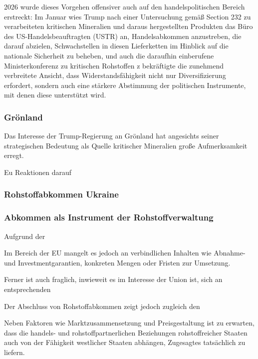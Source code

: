 \documentclass[12pt,a4paper,oneside]{book} %
\begin{document}
{2026 wurde dieses Vorgehen offensiver auch auf den handelspolitischen Bereich erstreckt:  Im Januar wies Trump nach einer Untersuchung gemäß Section 232 zu verarbeiteten kritischen Mineralien und daraus hergestellten Produkten das Büro des US-Handelsbeauftragten (USTR) an, Handelsabkommen anzustreben, die darauf abzielen, Schwachstellen in diesen Lieferketten im Hinblick auf die nationale Sicherheit zu beheben, und auch die daraufhin einberufene Ministerkonferenz zu kritischen Rohstoffen z bekräftigte die zunehmend verbreitete Ansicht, dass Widerstandsfähigkeit nicht nur Diversifizierung erfordert, sondern auch eine stärkere Abstimmung der politischen Instrumente, mit denen diese unterstützt wird.\autocite{EY, Trade policy and the 2026 redesign of critical mineral supply chains}

\subsubsection{Grönland}

Das Interesse der Trump-Regierung an Grönland hat angesichts seiner strategischen Bedeutung als Quelle kritischer Mineralien große Aufmerksamkeit erregt.

Eu Reaktionen darauf

\subsubsection{Rohstoffabkommen Ukraine}


\subsubsection{Abkommen als Instrument der Rohstoffverwaltung}


Aufgrund der 

Im Bereich der EU mangelt es jedoch an verbindlichen Inhalten wie Abnahme- und Investmentgarantien, konkreten Mengen oder Fristen zur Umsetzung.

Ferner ist auch fraglich, inwieweit es im Interesse der Union ist, sich an entsprechenden

Der Abschluss von Rohstoffabkommen zeigt jedoch zugleich den 

Neben Faktoren wie Marktzusammensetzung und Preisgestaltung ist zu erwarten, dass die handels- und rohstoffpartnerlichen Beziehungen rohstoffreicher Staaten auch von der Fähigkeit westlicher Staaten abhängen, Zugesagtes tatsächlich zu liefern.\autocite{Frenz 2025, 90.}


}
\end{document}
